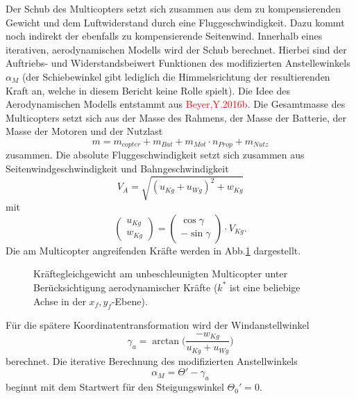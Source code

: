 Der Schub des Multicopters setzt sich zusammen aus dem zu kompensierenden Gewicht und dem Luftwiderstand durch eine Fluggeschwindigkeit. Dazu kommt noch indirekt der ebenfalls zu kompensierende Seitenwind. Innerhalb eines iterativen, aerodynamischen Modells wird der Schub berechnet. Hierbei sind der Auftriebs- und Widerstandsbeiwert Funktionen des modifizierten Anstellewinkels \ensuremath{\alpha_M} (der Schiebewinkel gibt lediglich die Himmelsrichtung der resultierenden Kraft an, welche in diesem Bericht keine Rolle spielt). Die Idee des Aerodynamischen Modells entstammt aus \textcolor{red}{Beyer,Y.2016b}. 
Die Gesamtmasse des Multicopters setzt sich aus der Masse des Rahmens, der Masse der Batterie, der Masse der Motoren und der Nutzlast
\begin{equation}
	m = m_{copter}+m_{Bat}+m_{Mot}\cdot n_{Prop}+m_{Nutz}
\end{equation}
zusammen.
Die absolute Fluggeschwindigkeit setzt sich zusammen aus Seitenwindgeschwindigkeit und Bahngeschwindigkeit
\begin{equation}
	V_A = \sqrt{(u_{Kg} + u_{Wg})^2+w_{Kg}}
\end{equation}
mit
\begin{equation}
	\begin{pmatrix} u_{Kg} \\ w_{Kg} \end{pmatrix} = \begin{pmatrix}
	\cos\gamma \\ -\sin\gamma	\end{pmatrix} \cdot V_{Kg}.
\end{equation}
Die am Multicopter angreifenden Kräfte werden in Abb.\ref{abb:kraefteggw} dargestellt. 

\begin{figure}[H]
\centering
\begin{small}
	
	\end{small}
	\caption{Kräftegleichgewicht am unbeschleunigten Multicopter unter Berücksichtigung aerodynamischer Kräfte ($k^*$ ist eine beliebige Achse in der $x_f,y_f$-Ebene).}
	\label{abb:kraefteggw}
\end{figure}

Für die spätere Koordinatentransformation wird der Windanstellwinkel
\begin{equation}
	\gamma_a = \arctan \Big(\frac{-w_{Kg}}{u_{Kg}+u_{Wg}}\Big)
\end{equation}
berechnet.
Die iterative Berechnung des modifizierten Anstellwinkels 
\begin{equation}
	\alpha_M = \Theta '-\gamma_a
\end{equation} 
beginnt mit dem Startwert für den Steigungswinkel \ensuremath{\Theta_0'=0}.

